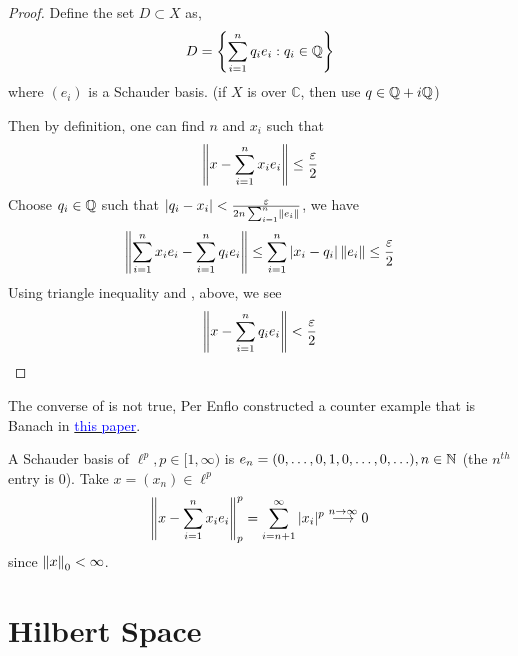 \documentclass{article}
\begin{document}
\begin{proof}
	Define the set $D \subset X$ as,
	$$
		D = \left\{\sum_{i=1}^n q_i e_i: q_i \in \mathbb{Q} \right\}
	$$
	where $(e_i)$ is a Schauder basis. (if $X$ is over $\mathbb{C}$, then use $q \in \mathbb{Q} + i \mathbb{Q}$)

	Then by definition, one can find $n$ and $x_i$ such that
	\begin{equation}
		\label{3}
		\left\|{x - \sum_{i=1}^n x_i e_i}\right\| \leq \frac{\varepsilon}{2}
	\end{equation}
	Choose $q_i \in \mathbb{Q}$ such that $|q_i - x_i|<\frac{\varepsilon}{2n \sum_{i=1}^n \left\|{e_i}\right\|}$, we have
	\begin{equation}
		\label{4}
		\left\|{\sum_{i=1}^n x_i e_i - \sum_{i=1}^n q_i e_i}\right\| \leq \sum_{i=1}^n |x_i-q_i| \left\|{e_i}\right\| \leq \frac{\varepsilon}{2}
	\end{equation}
	Using triangle inequality and ,  above, we see
	$$
		\left\|{x-\sum_{i=1}^n q_i e_i}\right\| < \frac{\varepsilon}{2}
	$$
\end{proof}

\begin{remark}
	The converse of  is not true, Per Enflo constructed a counter example that is Banach in \href{https://projecteuclid.org/download/pdf_1/euclid.acta/1485889774}{\textcolor{blue}{this paper}}.
\end{remark}

\begin{example}
	A Schauder basis of $\ell^p, p\in [1, \infty)$ is $e_n=(0,\ldots, 0,1,0, \ldots,0,\ldots), n\in \mathbb{N}$ (the $n^{th}$ entry is $0$).
	Take $x=(x_n)\in \ell^p$
	$$
		\left\|{x-\sum_{i=1}^n x_ie_i}\right\|_p^p = \sum_{i=n+1}^{\infty} |x_i|^p \overset{n\to \infty}{\longrightarrow} 0
	$$
	since $\left\|{x}\right\|_0 < \infty$.
\end{example}



\section{Hilbert Space}

\begin{comment}
	Hilbert space is a special class of Banach space.
	Apart from completeness and norm, it is also equipped with an additional structure,
	{\bf inner product}. This allows us to explore nice geometric properties of the space,
	like orthogonality and angle. We'll see later that this structure resemble Euclidean space in many ways. A Hilbert space is naturally Banach, while the reverse may not be true.
\end{comment}
\end{document}
